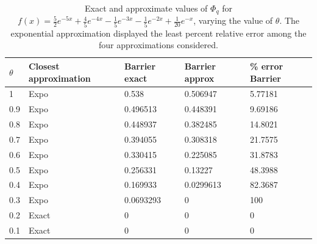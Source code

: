 \begin{table}[]
\begin{tabular}{|l|l|l|l|l|}
\hline
$\theta$ & Closest approximation & Barrier exact & Barrier approx & \% error Barrier \\ \hline
1   & Expo                    & 0.538           & 0.506947  & 5.77181            \\ \hline
0.9 & Expo                    & 0.496513        & 0.448391  & 9.69186            \\ \hline
0.8 & Expo                    & 0.448937        & 0.382485  & 14.8021            \\ \hline
0.7 & Expo                    & 0.394055        & 0.308318  & 21.7575            \\ \hline
0.6 & Expo                    & 0.330415        & 0.225085  & 31.8783            \\ \hline
0.5 & Expo                    & 0.256331        & 0.13227   & 48.3988            \\ \hline
0.4 & Expo                    & 0.169933        & 0.0299613 & 82.3687            \\ \hline
0.3 & Expo                    & 0.0693293       & 0         & 100                \\ \hline
0.2 & Exact                   & 0               & 0         & 0                  \\ \hline
0.1 & Exact                   & 0               & 0         & 0                  \\ \hline
\end{tabular}
\caption{Exact and approximate values of $\Phi_q$ for $f(x)=\frac{5}{2 }e^{-5x}+\frac{4}{5} e^{-4 x}-\frac{1}{5}e^{-3x}- \frac{1}{5}e^{-2x}+ \frac{1}{20}e^{-x}$, varying the value of $\theta$. The exponential approximation displayed the least percent relative error among the four approximations considered.}
\label{table:NH5mmBar}
\end{table} 